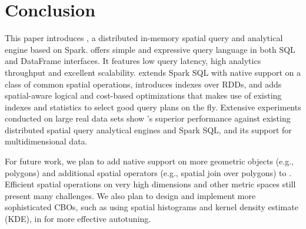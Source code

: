 \section{Conclusion}
\label{sec:conclude}
This paper introduces \name, a distributed in-memory spatial query and
analytical engine based on Spark. \name offers simple and expressive
query language in both SQL and DataFrame interfaces. It features low
query latency, high analytics throughput and excellent
scalability. \name extends Spark SQL with native support on a class of
common spatial operations, introduces indexes over RDDs, and adds
spatial-aware logical and cost-based optimizations that makes use of
existing indexes and statistics to select good query plans on the
fly. Extensive experiments conducted on large real data sets show
\name's superior performance against existing distributed spatial
query analytical engines and Spark SQL, and its support for
multidimensional data.

For future work, we plan to add native support on more geometric
objects (e.g., polygons) and additional spatial operators (e.g.,
spatial join over polygons) to \name. Efficient spatial operations on
very high dimensions and other metric spaces still present many
challenges. We also plan to design and implement more sophisticated
CBOs, such as using spatial histograms and kernel density estimate
(KDE), in \name for more effective autotuning.
 


